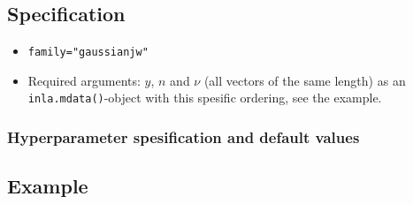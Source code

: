 \documentclass[a4paper,11pt]{article}
\begin{document}
\subsection*{Specification}

\begin{itemize}
\item \texttt{family="gaussianjw"}
\item Required arguments: $y$, $n$ and $\nu$ (all vectors of the same
    length) as an \texttt{inla.mdata()}-object with this spesific
    ordering, see the example.
\end{itemize}



\subsubsection*{Hyperparameter spesification and default values}


\subsection*{Example}

\end{document}
